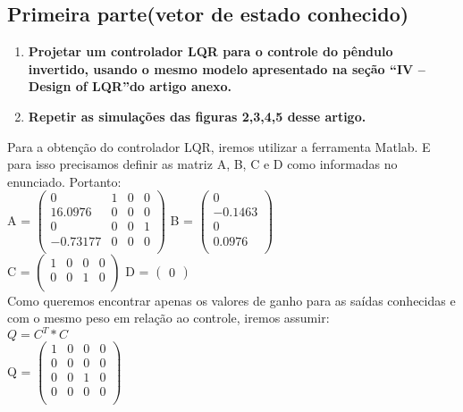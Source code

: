 \documentclass[a4paper]{article}
\begin{document}
\subsection{Primeira parte(vetor de estado conhecido)}
\begin{enumerate}
    \item \textbf{Projetar um controlador LQR para o controle do pêndulo invertido, usando o mesmo modelo apresentado na seção “IV –Design of LQR”do artigo anexo.}
    \item \textbf{Repetir as simulações das figuras 2,3,4,5 desse artigo.}
    \end{enumerate}
    
Para a obtenção do controlador LQR, iremos utilizar a ferramenta Matlab. E para isso precisamos definir as matriz A, B, C e D como informadas no enunciado. Portanto:\\
\newline
A = $ \begin{pmatrix} 
0 & 1 & 0 & 0 \\ 16.0976 & 0 & 0 & 0 \\ 0 & 0 & 0 & 1 \\ -0.73177 & 0 & 0 & 0\\
\end{pmatrix}$ \qquad \qquad
B = $ \begin{pmatrix}
0 \\ -0.1463 \\ 0 \\ 0.0976\\
\end{pmatrix}$\\
\newline
\newline
C = $\begin{pmatrix}
1 & 0 & 0 & 0 \\ 0 & 0 & 1 & 0\\
\end{pmatrix}$ \qquad \qquad \qquad \qquad         D = $\begin{pmatrix}
0
\end{pmatrix}$\\
\newline
\newline
Como queremos encontrar apenas os valores de ganho para as saídas conhecidas e com o mesmo peso em relação ao controle, iremos assumir:\\
\(Q = C^{T}*C\)\\
\newline
Q = $\begin{pmatrix}
     1 & 0 & 0 &  0\\
     0 & 0 & 0 & 0\\
     0 & 0 & 1 & 0\\
     0 & 0 & 0 & 0\\
\end{pmatrix}$
\end{document}
